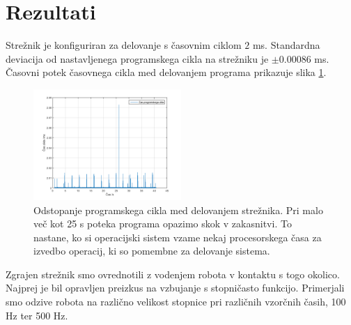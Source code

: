 \documentclass[a4paper]{article}
\begin{document}
\section{Rezultati}
Stre\-žnik je konfiguriran za delovanje s časovnim ciklom $2$ ms. Standardna deviacija od nastavljenega programskega cikla na strežniku je  $\pm 0.00086 $ ms. Časovni potek časovnega cikla med delovanjem programa prikazuje slika \ref{fig:jittergraph}.

\begin{figure}[!h]
	\centering
	\includegraphics[width=0.5\textwidth]{./slike/figure_jitter}
	\caption{Odstopanje programskega cikla med delovanjem strežnika. Pri malo več kot 25 s poteka programa opazimo skok v zakasnitvi. To nastane, ko si operacijski sistem vzame nekaj procesorskega časa za izvedbo operacij, ki so pomembne za delovanje sistema.}
	\label{fig:jittergraph}
	
\end{figure}

Zgrajen strežnik smo ovrednotili z vodenjem robota v kontaktu s togo okolico. Najprej je bil opravljen preizkus na vzbujanje s stopničasto funkcijo. Primerjali smo odzive robota na različno velikost stopnice pri različnih vzorčnih časih, 100 Hz ter 500 Hz.
\end{document}
